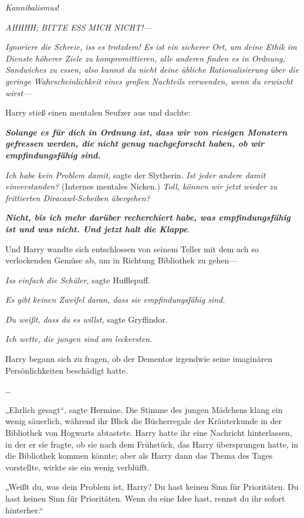 {\emph{Kannibalismus}!

\emph{AHHHH; BITTE ESS MICH NICHT!—}

\emph{Ignoriere die Schreie, iss es trotzdem! Es ist ein sicherer Ort, um deine Ethik im Dienste höherer Ziele zu kompromittieren, alle anderen finden es in Ordnung, Sandwiches zu essen, also kannst du nicht deine übliche Rationalisierung über die geringe Wahrscheinlichkeit eines großen Nachteils verwenden, wenn du erwischt wirst—}

Harry stieß einen mentalen Seufzer aus und dachte:

\textbf{\emph{Solange es für dich in Ordnung ist, dass wir von riesigen Monstern gefressen werden, die nicht genug nachgeforscht haben, ob wir empfindungsfähig sind.}}

\emph{Ich habe kein Problem damit,} sagte der Slytherin. \emph{Ist jeder andere damit einverstanden?} (Internes mentales Nicken.) \emph{Toll, können wir jetzt wieder zu frittierten Diracawl-Scheiben übergehen?}

\textbf{\emph{Nicht, bis ich mehr darüber recherchiert habe, was empfindungsfähig ist und was nicht. Und jetzt halt die Klappe}}.

Und Harry wandte sich entschlossen von seinem Teller mit dem ach so verlockenden Gemüse ab, um in Richtung Bibliothek zu gehen—

\emph{Iss einfach die Schüler,} sagte Hufflepuff.

\emph{Es gibt keinen Zweifel daran, dass sie empfindungsfähig sind.}

\emph{Du weißt, dass du es willst,} sagte Gryffindor.

\emph{Ich wette, die jungen sind am leckersten.}

Harry begann sich zu fragen, ob der Dementor irgendwie seine imaginären Persönlichkeiten beschädigt hatte.

…

„Ehrlich gesagt“, sagte Hermine. Die Stimme des jungen Mädchens klang ein wenig säuerlich, während ihr Blick die Bücherregale der Kräuterkunde in der Bibliothek von Hogwarts abtastete. Harry hatte ihr eine Nachricht hinterlassen, in der er sie fragte, ob sie nach dem Frühstück, das Harry übersprungen hatte, in die Bibliothek kommen könnte; aber als Harry dann das Thema des Tages vorstellte, wirkte sie ein wenig verblüfft.

„Weißt du, was dein Problem ist, Harry? Du hast keinen Sinn für Prioritäten. Du hast keinen Sinn für Prioritäten. Wenn du eine Idee hast, rennst du ihr sofort hinterher.“

}
